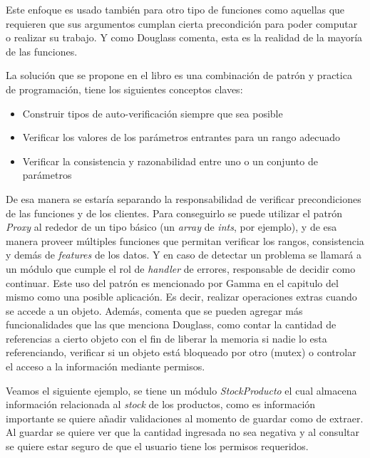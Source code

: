 Este enfoque es usado también para otro tipo de funciones como aquellas que requieren que sus argumentos cumplan cierta precondición para poder computar o realizar su trabajo. Y como Douglass comenta, esta es la realidad de la mayoría de las funciones.

La solución que se propone en el libro es una combinación de patrón y practica de programación, tiene los siguientes conceptos claves:

\begin{itemize}
    \item Construir tipos de auto-verificación siempre que sea posible
    \item Verificar los valores de los parámetros entrantes para un rango adecuado
    \item Verificar la consistencia y razonabilidad entre uno o un conjunto de parámetros
\end{itemize}

De esa manera se estaría separando la responsabilidad de verificar precondiciones de las funciones y de los clientes. Para conseguirlo se puede utilizar el patrón \textit{Proxy} al rededor de un tipo básico (un \textit{array} de \textit{ints}, por ejemplo), y de esa manera proveer múltiples funciones que permitan verificar los rangos, consistencia y demás de \textit{features} de los datos. Y en caso de detectar un problema se llamará a un módulo que cumple el rol de \textit{handler} de errores, responsable de decidir como continuar. Este uso del patrón es mencionado por Gamma en el capitulo del mismo como una posible aplicación. Es decir, realizar operaciones extras cuando se accede a un objeto. Además, comenta que se pueden agregar más funcionalidades que las que menciona Douglass, como contar la cantidad de referencias a cierto objeto con el fin de liberar la memoria si nadie lo esta referenciando, verificar si un objeto está bloqueado por otro (mutex) o controlar el acceso a la información mediante permisos.

Veamos el siguiente ejemplo, se tiene un módulo \textit{StockProducto} el cual almacena información relacionada al \textit{stock} de los productos, como es información importante se quiere añadir validaciones al momento de guardar como de extraer. Al guardar se quiere ver que la cantidad ingresada no sea negativa y al consultar se quiere estar seguro de que el usuario tiene los permisos requeridos.

